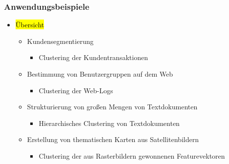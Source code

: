 \begin{frame}%
\frametitle{Anwendungsbeispiele}

\begin{itemize}
\item \hl{Übersicht}
\begin{itemize}
\item  Kundensegmentierung
\begin{itemize}
\item  Clustering der Kundentransaktionen
\end{itemize}
\item  Bestimmung von Benutzergruppen auf dem Web
\begin{itemize}
\item  Clustering der Web-Logs
\end{itemize}
\item  Strukturierung von großen Mengen von Textdokumenten
\begin{itemize}
\item  Hierarchisches Clustering von Textdokumenten
\end{itemize}
\item  Erstellung von thematischen Karten aus Satellitenbildern
\begin{itemize}
\item  Clustering der aus Rasterbildern gewonnenen Featurevektoren
\end{itemize}
\end{itemize}
\end{itemize}

\end{frame}



